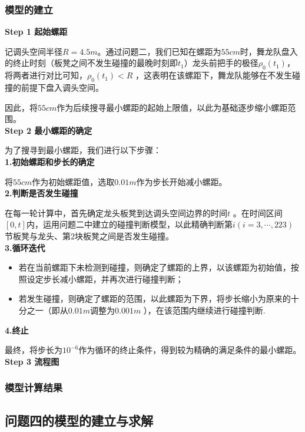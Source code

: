 \documentclass{cumcmthesis}
\begin{document}
\subsubsection{模型的建立}
\noindent\textbf{Step 1 起始螺距}
\par   记调头空间半径\(R = 4.5m\)。通过问题二，我们已知在螺距为\(55cm\)时，舞龙队盘入的终止时刻（板凳之间不发生碰撞的最晚时刻即$t_1$）龙头前把手的极径$\rho _0(t_1)$，将两者进行对比可知，\(\rho _0(t_1)<R\) ，这表明在该螺距下，舞龙队能够在不发生碰撞的前提下盘入调头空间。
\par 因此，将\(55cm\)作为后续搜寻最小螺距的起始上限值，以此为基础逐步缩小螺距范围。
\\\textbf{Step 2 最小螺距的确定}
\par 为了搜寻到最小螺距，我们进行以下步骤：
\\\noindent\textbf{1.初始螺距和步长的确定}
\par 将\(55cm\)作为初始螺距值，选取\(0.01m\)作为步长开始减小螺距。
\\\noindent\textbf{2.判断是否发生碰撞}
\par 在每一轮计算中，首先确定龙头板凳到达调头空间边界的时间\(t\) 。在时间区间\([0, t]\)内，运用问题二中建立的碰撞判断模型，以此精确判断第$i(i=3,\cdots,223)$节板凳与龙头、第\(2\)块板凳之间是否发生碰撞。
\\\noindent\textbf{3.循环迭代}
\begin{itemize}
\item 若在当前螺距下未检测到碰撞，则确定了螺距的上界，以该螺距为初始值，按照设定步长减小螺距，并再次进行碰撞判断；
\item 若发生碰撞，则确定了螺距的范围，以此螺距为下界，将步长缩小为原来的十分之一（即从\(0.01m\)调整为\(0.001m\) ），在该范围内继续进行碰撞判断.
\end{itemize}
\noindent\textbf{4.终止}
\par 最终，将步长为$10^{-6}$作为循环的终止条件，得到较为精确的满足条件的最小螺距。
\textbf{Step 3 流程图 }

\subsubsection{模型计算结果}
\subsection{问题四的模型的建立与求解}
\end{document}
